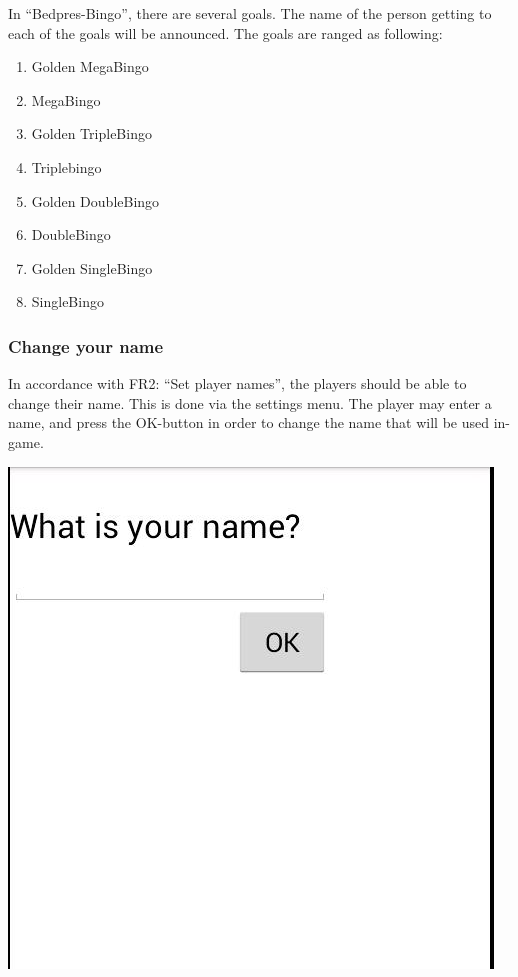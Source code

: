 In ``Bedpres-Bingo'', there are several goals. The name of the person
getting to each of the goals will be announced.
The goals are ranged as following:
\begin{enumerate}
	\item{Golden MegaBingo}
	\item{MegaBingo}
	\item{Golden TripleBingo}
	\item{Triplebingo}
	\item{Golden DoubleBingo}
	\item{DoubleBingo}
	\item{Golden SingleBingo}
	\item{SingleBingo}
\end{enumerate}


\subsubsection{Change your name}
In accordance with FR2: ``Set player names'', the players should be able to
change their name. This is done via the settings menu. The player may enter a
name, and press the OK-button in order to change the name that will be used
in-game.

\begin{center}
\includegraphics{Pikks/settings}
\end{center}
